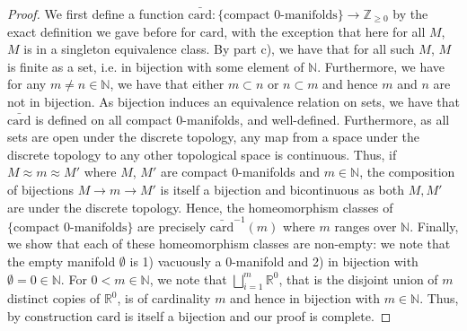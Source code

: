 \documentclass[english]{article}
\newcommand{\RR}{\mathbb{R}}
\newcommand{\NN}{\mathbb{N}}
\newcommand{\ZZ}{\mathbb{Z}}
\theoremstyle{remark}
\theoremstyle{definition}
\newcommand{\card}{\mathrm{card}}
\begin{document}
\begin{proof}
	We first define a function $\bar{\card}:\{\text{compact 0-manifolds}\}\to \ZZ_{\geq 0}$ by the exact definition we gave before for $\card$, with the exception that here for all $M$, $M$ is in a singleton equivalence class. By part c), we have that for all such $M$, $M$ is finite as a set, i.e. in bijection with some element of $\NN$. Furthermore, we have for any $m\neq n\in \NN$, we have that either $m\subset n$ or $n\subset m$ and hence $m$ and $n$ are not in bijection. As bijection induces an equivalence relation on sets, we have that $\bar{\card}$ is defined on all compact $0$-manifolds, and well-defined. Furthermore, as all sets are open under the discrete topology, any map from a space under the discrete topology to any other topological space is continuous. Thus, if $M\approx m \approx M'$ where $M$, $M'$ are compact 0-manifolds and $m\in \NN$, the composition of bijections $M\to m \to M'$ is itself a bijection and bicontinuous as both $M,M'$ are under the discrete topology. Hence, the homeomorphism classes of $\{\text{compact 0-manifolds}\}$ are precisely $\bar{\card}^{-1}(m)$ where $m$ ranges over $\NN$. Finally, we show that each of these homeomorphism classes are non-empty: we note that the empty manifold $\emptyset$ is 1) vacuously a $0$-manifold and 2) in bijection with $\emptyset=0\in \NN$. For $0<m\in \NN$, we note that $\bigsqcup_{i=1}^m \RR^0$, that is the disjoint union of $m$ distinct copies of $\RR^0$, is of cardinality $m$ and hence in bijection with $m\in \NN$. Thus, by construction $\card$ is itself a bijection and our proof is complete.
\end{proof}
\end{document}
